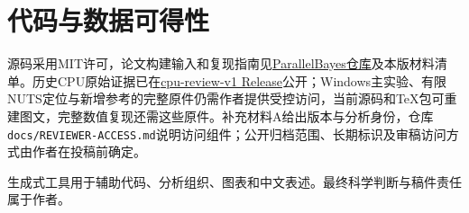\documentclass[UTF8,fontset=fandol,zihao=-4]{ctexart}
\begin{document}
\section*{代码与数据可得性}
源码采用MIT许可，论文构建输入和复现指南见\href{https://github.com/AlchemistXC/ParallelBayes}{ParallelBayes仓库}及本版材料清单。历史CPU原始证据已在\href{https://github.com/AlchemistXC/ParallelBayes/releases/tag/cpu-review-v1}{cpu-review-v1 Release}公开；Windows主实验、有限NUTS定位与新增参考的完整原件仍需作者提供受控访问，当前源码和TeX包可重建图文，完整数值复现还需这些原件。补充材料A给出版本与分析身份，仓库\texttt{docs/REVIEWER-ACCESS.md}说明访问组件；公开归档范围、长期标识及审稿访问方式由作者在投稿前确定。

生成式工具用于辅助代码、分析组织、图表和中文表述。最终科学判断与稿件责任属于作者。

\end{document}
